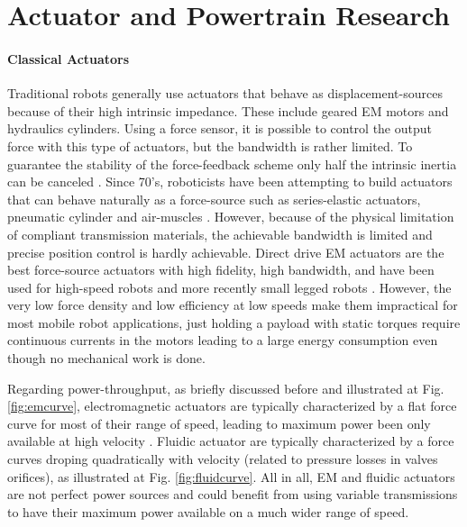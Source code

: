 \section{Actuator and Powertrain Research}
\label{sec:actres}

\paragraph{Classical Actuators} Traditional robots generally use actuators that behave as displacement-sources because of their high intrinsic impedance. These include geared EM motors and hydraulics cylinders. Using a force sensor, it is possible to control the output force with this type of actuators, but the bandwidth is rather limited. To guarantee the stability of the force-feedback scheme only half the intrinsic inertia can be canceled \cite{hogan_impedance_2004}. Since 70's, roboticists have been attempting to build actuators that can behave naturally as a force-source such as series-elastic actuators, pneumatic cylinder and air-muscles \cite{hanafusa_stable_1977}\cite{pratt_series_1995}. However, because of the physical limitation of compliant transmission materials, the achievable bandwidth is limited and precise position control is hardly achievable. Direct drive EM actuators are the best force-source actuators with high fidelity, high bandwidth, and have been used for high-speed robots \cite{asada_direct-drive_1987} and more recently small legged robots \cite{kenneally_design_2016}. However, the very low force density \cite{hollerbach_comparative_1992} and low efficiency at low speeds make them impractical for most mobile robot applications, just holding a payload with static torques require continuous currents in the motors leading to a large energy consumption even though no mechanical work is done. 

Regarding power-throughput, as briefly discussed before and illustrated at Fig. \ref{fig:emcurve}, electromagnetic actuators are typically characterized by a flat force curve for most of their range of speed, leading to maximum power been only available at high velocity \cite{girard_two-speed_2015}. Fluidic actuator are typically characterized by a force curves droping quadratically with velocity (related to pressure losses in valves orifices), as illustrated at Fig. \ref{fig:fluidcurve}. All in all, EM and fluidic actuators are not perfect power sources and could benefit from using variable transmissions to have their maximum power available on a much wider range of speed.

